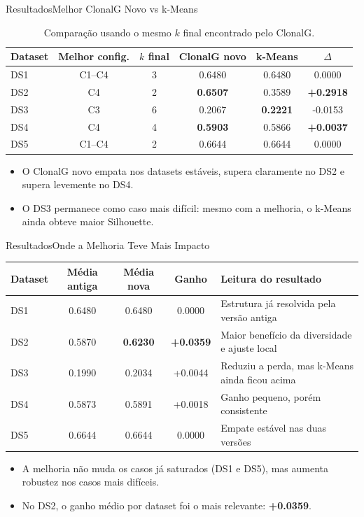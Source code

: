 \documentclass[aspectratio=169, 11pt]{beamer}
\begin{document}
\begin{frame}{Resultados}{Melhor ClonalG Novo vs k-Means}
  \begin{table}
    \centering
    \small
    \begin{tabular}{lccccc}
      \toprule
      Dataset & Melhor config. & $k$ final & ClonalG novo & k-Means & $\Delta$ \\
      \midrule
      DS1 & C1--C4 & 3 & 0.6480 & 0.6480 & 0.0000 \\
      DS2 & C4 & 2 & \textbf{0.6507} & 0.3589 & \textbf{+0.2918} \\
      DS3 & C3 & 6 & 0.2067 & \textbf{0.2221} & -0.0153 \\
      DS4 & C4 & 4 & \textbf{0.5903} & 0.5866 & \textbf{+0.0037} \\
      DS5 & C1--C4 & 2 & 0.6644 & 0.6644 & 0.0000 \\
      \bottomrule
    \end{tabular}
    \caption{Comparação usando o mesmo $k$ final encontrado pelo ClonalG.}
  \end{table}
  \begin{itemize}
    \item O ClonalG novo empata nos datasets estáveis, supera claramente no DS2 e supera levemente no DS4.
    \item O DS3 permanece como caso mais difícil: mesmo com a melhoria, o k-Means ainda obteve maior Silhouette.
  \end{itemize}
\end{frame}

\begin{frame}{Resultados}{Onde a Melhoria Teve Mais Impacto}
  \begin{table}
    \centering
    \small
    \begin{tabular}{lcccp{4.2cm}}
      \toprule
      Dataset & Média antiga & Média nova & Ganho & Leitura do resultado \\
      \midrule
      DS1 & 0.6480 & 0.6480 & 0.0000 & Estrutura já resolvida pela versão antiga \\
      DS2 & 0.5870 & \textbf{0.6230} & \textbf{+0.0359} & Maior benefício da diversidade e ajuste local \\
      DS3 & 0.1990 & 0.2034 & +0.0044 & Reduziu a perda, mas k-Means ainda ficou acima \\
      DS4 & 0.5873 & 0.5891 & +0.0018 & Ganho pequeno, porém consistente \\
      DS5 & 0.6644 & 0.6644 & 0.0000 & Empate estável nas duas versões \\
      \bottomrule
    \end{tabular}
  \end{table}
  \begin{itemize}
    \item A melhoria não muda os casos já saturados (DS1 e DS5), mas aumenta robustez nos casos mais difíceis.
    \item No DS2, o ganho médio por dataset foi o mais relevante: \textbf{+0.0359}.
  \end{itemize}
\end{frame}
\end{document}
